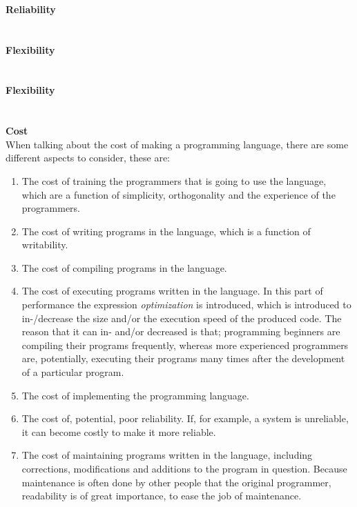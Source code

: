  \\
\\ \\
\textbf{Reliability} \\
\\ \\
\textbf{Flexibility} \\
\\ \\
\textbf{Flexibility} \\
\\ \\
\textbf{Cost} \\
When talking about the cost of making a programming language, there are some different aspects to consider, these are:
\begin{enumerate}
	\item The cost of training the programmers that is going to use the language, which are a function of simplicity, orthogonality and the experience of the programmers.
	\item The cost of writing programs in the language, which is a function of writability.
	\item The cost of compiling programs in the language.
	\item The cost of executing programs written in the language. In this part of performance the expression \textit{optimization} is introduced, which is introduced to in-/decrease the size and/or the execution speed of the produced code. The reason that it can in- and/or decreased is that; programming beginners are compiling their programs frequently, whereas more experienced programmers are, potentially, executing their programs many times after the development of a particular program.
	\item The cost of implementing the programming language.
	\item The cost of, potential, poor reliability. If, for example, a system is unreliable, it can become costly to make it more reliable.
	\item The cost of maintaining programs written in the language, including corrections, modifications and additions to the program in question. Because maintenance is often done by other people that the original programmer, readability is of great importance, to ease the job of maintenance.
\end{enumerate}

